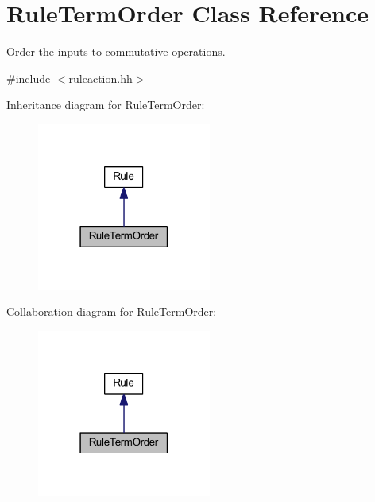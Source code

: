 \hypertarget{class_rule_term_order}{}\section{Rule\+Term\+Order Class Reference}
\label{class_rule_term_order}


Order the inputs to commutative operations.  




{\ttfamily \#include $<$ruleaction.\+hh$>$}



Inheritance diagram for Rule\+Term\+Order\+:
\nopagebreak
\begin{figure}[H]
\begin{center}
\leavevmode
\includegraphics[width=162pt]{class_rule_term_order__inherit__graph}
\end{center}
\end{figure}


Collaboration diagram for Rule\+Term\+Order\+:
\nopagebreak
\begin{figure}[H]
\begin{center}
\leavevmode
\includegraphics[width=162pt]{class_rule_term_order__coll__graph}
\end{center}
\end{figure}
